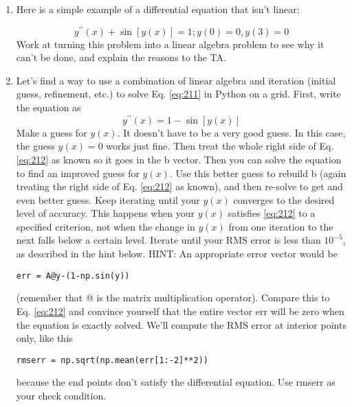 	\begin{problem} \label{P2.5}
\begin{enumerate}[label=(\alph*)]
\item Here is a simple example of a differential equation that isn\rq t linear:

	\begin{equation}\label{eq:211}
		y^{\prime\prime}(x) + \sin[y(x)] = 1 ; y(0) = 0, y(3) = 0
	\end{equation}
		Work at turning this problem into a linear algebra problem to see why
it can\rq t be done, and explain the reasons to the TA.
\item Let\rq s find a way to use a combination of linear algebra and iteration
(initial guess, refinement, etc.) to solve Eq. \eqref{eq:211} in Python on a grid.
First, write the equation as
\begin{equation}\label{eq:212}
		y^{\prime\prime}(x)= 1 - \sin[y(x)]
	\end{equation}
	Make a guess for $y(x)$. It doesn\rq t have to be a very good guess. In this
case, the guess $y(x) = 0$ works just fine. Then treat the whole right side
of Eq.\eqref{eq:212} as known so it goes in the b vector. Then you can solve the equation to find an improved guess for
$y(x)$. Use this better guess to rebuild b (again treating the right side of Eq. \eqref{eq:212} as known), and
then re-solve to get and even better guess. Keep iterating until your $y(x)$ converges to the desired level of accuracy. This happens when your $y(x)$  satisfies \eqref{eq:212}  to a specified criterion, not when the change
in $y(x)$ from one iteration to the next falls below a certain level. Iterate until your RMS error is less than $10^{-5}$, as described in the hint below.
HINT: An appropriate error vector would be
\begin{lstlisting}
err = A@y-(1-np.sin(y))
\end{lstlisting}
(remember that @ is the matrix multiplication operator). Compare
this to Eq. \eqref{eq:212}
 and convince yourself that the entire vector err will
be zero when the equation is exactly solved. We\rq ll compute the RMS
error at interior points only, like this
\begin{lstlisting}
rmserr = np.sqrt(np.mean(err[1:-2]**2))
\end{lstlisting}
because the end points don\rq t satisfy the differential equation. Use rmserr as your check condition.
\end{enumerate}
\end{problem}
